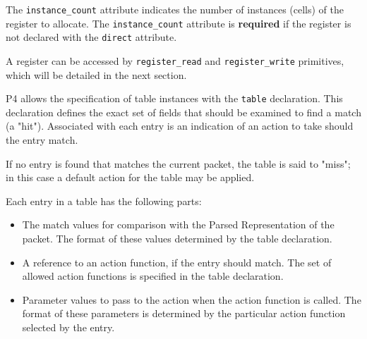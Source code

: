 \documentclass[12pt]{article}
\begin{document}

The \texttt{instance_count} attribute indicates the number of 
instances (cells) of the register to allocate. The 
\texttt{instance_count} attribute is \textbf{required} if the 
register is not declared with the \texttt{direct} attribute.

%
%
%
%

{\color{red}
A register can be accessed by \texttt{register_read} and 
\texttt{register_write} primitives, which will be detailed in the 
next section.
}


P4 allows the specification of table instances with the \texttt{table}
declaration. This declaration defines the exact set of fields that
should be examined to find a match (a "hit").  Associated with each
entry is an indication of an action to take should the entry match.

If no entry is found that matches the current packet, the table is said to 
"miss"; in this case a default action for the table may be applied.

Each entry in a \matchaction table has the following parts: 

\begin{itemize}
\item
The match values for comparison with the Parsed Representation of the packet. 
The format of these values determined by the table declaration.
\item
A reference to an action function, if the entry should match. The set
of allowed action functions is specified in the table declaration.
\item
Parameter values to pass to the action when the action function is called. 
The format of these parameters is determined by the particular action function 
selected by the entry.
\end{itemize}
\end{document}
